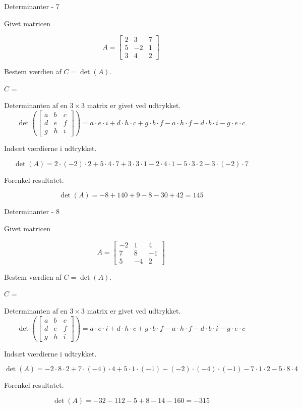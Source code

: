 \documentclass{article}
\begin{document}
\begin{exercise}{Determinanter - 7}

Givet matricen

\[
A = \left[\begin{array}{rrr}
2 & 3 & 7 \\
5 & -2 & 1 \\
3 & 4 & 2
\end{array} \right]
\]

Bestem værdien af $C = \det(A)$.

$C$ = 

\hint
Determinanten af en $3 \times 3$ matrix er givet ved udtrykket.
\[
\det \left( \left[\begin{array}{rrr}
a & b & c \\
d & e & f \\
g & h & i
\end{array} \right] \right) = a \cdot e \cdot i + d \cdot h \cdot c + g \cdot b \cdot f - a \cdot h \cdot f - d \cdot b \cdot i - g \cdot e \cdot c
\]

\hint
Indsæt værdierne i udtrykket.

\hint
\[
\det \left( A \right) = 2 \cdot (-2) \cdot 2 + 5 \cdot 4 \cdot 7 + 3 \cdot 3 \cdot 1 - 2 \cdot 4 \cdot 1 - 5 \cdot 3 \cdot 2 - 3 \cdot (-2) \cdot 7
\]

\hint
Forenkel resultatet.

\hint
\[
\det \left( A \right) = -8 + 140 + 9 - 8 -30 + 42 = 145
\]

\end{exercise}


\begin{exercise}{Determinanter - 8}

Givet matricen

\[
A = \left[\begin{array}{rrr}
-2 & 1 & 4 \\
7 & 8 & -1 \\
5 & -4 & 2
\end{array} \right]
\]

Bestem værdien af $C = \det(A)$.

$C$ = 

\hint
Determinanten af en $3 \times 3$ matrix er givet ved udtrykket.
\[
\det \left( \left[\begin{array}{rrr}
a & b & c \\
d & e & f \\
g & h & i
\end{array} \right] \right) = a \cdot e \cdot i + d \cdot h \cdot c + g \cdot b \cdot f - a \cdot h \cdot f - d \cdot b \cdot i - g \cdot e \cdot c
\]

\hint
Indsæt værdierne i udtrykket.

\hint
\[
\det \left( A \right) = -2 \cdot 8 \cdot 2 + 7 \cdot (-4) \cdot 4 + 5 \cdot 1 \cdot (-1) - (-2) \cdot (-4) \cdot (-1) - 7 \cdot 1 \cdot 2 - 5 \cdot 8 \cdot 4
\]

\hint
Forenkel resultatet.

\hint
\[
\det \left( A \right) = -32 - 112 - 5 + 8 - 14 - 160 = -315
\]

\end{exercise}
\end{document}
